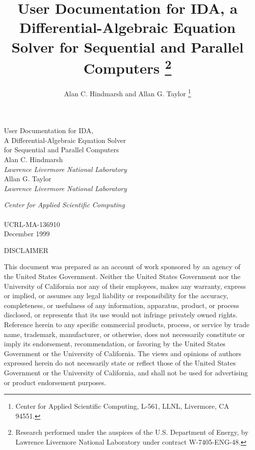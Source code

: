 \documentclass[11pt]{article}
\title{User Documentation for IDA, a Differential-Algebraic Equation
       Solver for Sequential and Parallel Computers%
\thanks{
Research performed under the auspices of the U.S.
Department of Energy, by Lawrence Livermore National Laboratory under
contract W-7405-ENG-48. } }
\author{Alan C. Hindmarsh and Allan G. Taylor%
\thanks{Center for Applied Scientific Computing, L-561,
        LLNL, Livermore, CA 94551.} }
\begin{document}
\thispagestyle{empty}

%
%

%
\vspace{2in}
\begin{center}
  {\LARGE 
    User Documentation for IDA, \\ 
    A Differential-Algebraic Equation Solver \\
    for Sequential and Parallel Computers
    } 
  \\
  \vspace{1in}
  {\large Alan C. Hindmarsh}\\
  {\large\em Lawrence Livermore National Laboratory}\\
  \vspace{0.25in}
  {\large Allan G. Taylor}\\
  {\large\em Lawrence Livermore National Laboratory}
\end{center}
\vfill
{\large\it Center for Applied Scientific Computing}\\
\vspace{0.7in}\\
{\large UCRL-MA-136910}\\
{\large December 1999}


\newpage

\thispagestyle{empty}

%
\vspace*{1.0in}
\scriptsize
\begin{center}
\begin{minipage}{4.0in}
\begin{center}
DISCLAIMER
\end{center}
This document was prepared as an account of work sponsored by an
agency of the United States Government.
Neither the United States Government nor the University of California
nor any of their employees, makes any warranty, express or implied, or
assumes any legal liability or responsibility for the accuracy,
completeness, or usefulness of any information, apparatus, product, or
process disclosed, or represents that its use would not infringe
privately owned rights.
Reference herein to any specific commercial products, process, or
service by trade name, trademark, manufacturer, or otherwise, does not
necessarily constitute or imply its endorsement, recommendation, or
favoring by the United States Government or the University of
California.
The views and opinions of authors expressed herein do not necessarily
state or reflect those of the United States Government or the
University of California, and shall not be used for advertising or
product endorsement purposes.  
\par\vspace*{1.0in}
\end{minipage}
\end{center}
\end{document}
